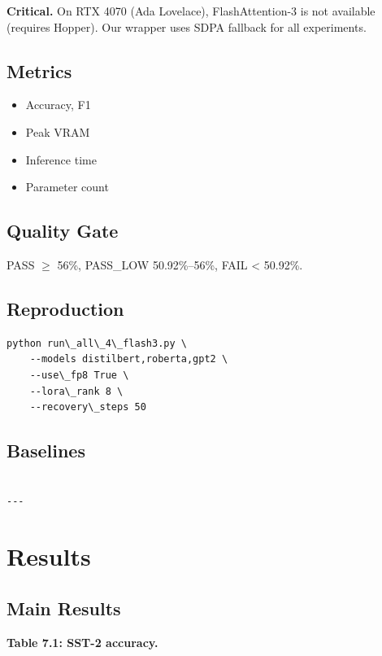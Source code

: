 \textbf{Critical.} On RTX 4070 (Ada Lovelace), FlashAttention-3 is not available 
(requires Hopper). Our wrapper uses SDPA fallback for all experiments.

\subsection{Metrics}

\begin{itemize}
\item Accuracy, F1
\item Peak VRAM
\item Inference time
\item Parameter count

\end{itemize}
\subsection{Quality Gate}

PASS $\ge$ 56\%, PASS\_LOW 50.92\%--56\%, FAIL \textless{} 50.92\%.

\subsection{Reproduction}

\begin{lstlisting}
python run\_all\_4\_flash3.py \
    --models distilbert,roberta,gpt2 \
    --use\_fp8 True \
    --lora\_rank 8 \
    --recovery\_steps 50
\end{lstlisting}

\subsection{Baselines}

\begin{lstlisting}

---
\end{lstlisting}

\section{Results}

\subsection{Main Results}

\textbf{Table 7.1: SST-2 accuracy.}

